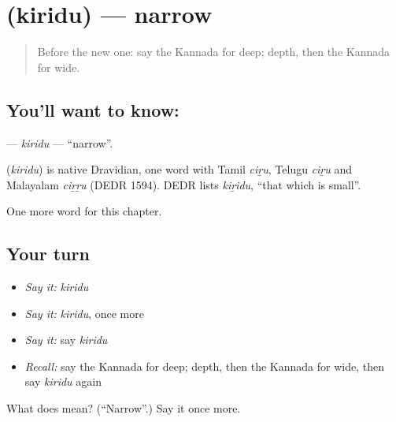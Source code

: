 \section[\texorpdfstring{\kn{ಕಿರಿದು} (kiridu)}{ಕಿರಿದು (kiridu)}]{ (kiridu) — narrow}

\label{lesson:KA-C142-kiridu}



\begin{quote}
Before the new one: say the Kannada for deep; depth, then the Kannada for wide.
\end{quote}

\subsection*{You'll want to know: }
\textbf{} — \emph{kiridu} — \textquotedblleft{}narrow\textquotedblright{}.

\begin{cousinweb}
\textbf{} (\emph{kiridu}) is native Dravidian, one word with Tamil \emph{ciṟu}, Telugu \emph{ciṟu} and Malayalam \emph{ciṟṟu} (DEDR 1594). DEDR lists \emph{kiṟidu}, \textquotedblleft{}that which is small\textquotedblright{}.
\end{cousinweb}

\begin{grammarlens}[title={What you've built}]
One more word for this chapter.
\end{grammarlens}

\subsection*{Your turn}
\begin{itemize}
\raggedright
  \item \emph{Say it:} \emph{kiridu}
  \item \emph{Say it:} \emph{kiridu}, once more
  \item \emph{Say it:} say \emph{kiridu}
  \item \emph{Recall:} say the Kannada for deep; depth, then the Kannada for wide, then say \emph{kiridu} again
\end{itemize}

\begin{tcolorbox}[breakable,colback=teal!4,colframe=teal!35!black,title={Before you move on}]
What does  mean? (\textquotedblleft{}Narrow\textquotedblright{}.) Say it once more.
\end{tcolorbox}

